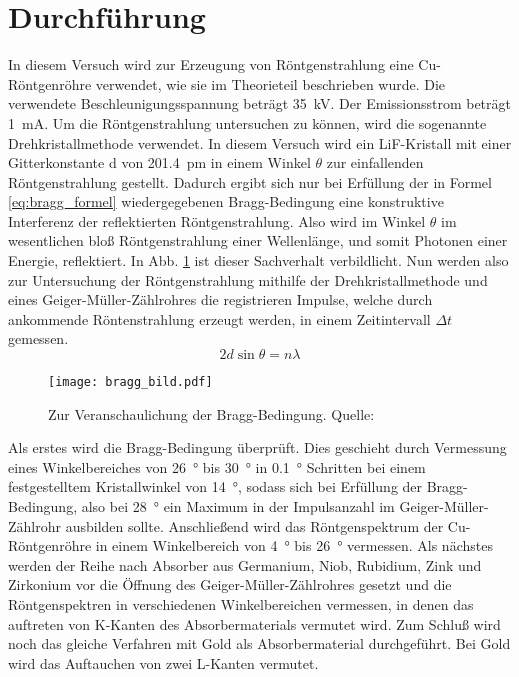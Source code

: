 
\section{Durchführung}
%
In diesem Versuch wird zur Erzeugung von Röntgenstrahlung eine
Cu-Röntgenröhre verwendet, wie sie im Theorieteil beschrieben wurde. Die
verwendete Beschleunigungsspannung beträgt \SI{35}{\kilo\volt}. Der
Emissionsstrom beträgt \SI{1}{\milli\ampere}.  Um die Röntgenstrahlung
untersuchen zu können, wird die sogenannte Drehkristallmethode
verwendet. In diesem Versuch wird ein LiF-Kristall mit einer
Gitterkonstante d von \SI{201.4}{\pico\metre} in einem Winkel $\theta$
zur einfallenden Röntgenstrahlung gestellt. Dadurch ergibt sich nur bei
Erfüllung der in Formel \eqref{eq:bragg_formel} wiedergegebenen
Bragg-Bedingung eine konstruktive Interferenz der reflektierten
Röntgenstrahlung. Also wird im Winkel $\theta$ im wesentlichen bloß
Röntgenstrahlung einer Wellenlänge, und somit Photonen einer Energie,
reflektiert. In Abb. \ref{fig:bragg_bild} ist dieser Sachverhalt
verbildlicht.  Nun werden also zur Untersuchung der Röntgenstrahlung
mithilfe der Drehkristallmethode und eines Geiger-Müller-Zählrohres die
registrieren Impulse, welche durch ankommende Röntenstrahlung erzeugt
werden, in einem Zeitintervall $\Delta t$ gemessen.
%
\begin{equation}
2 d \sin{\theta} = n \lambda
\label{eq:bragg_formel}
\end{equation}
%
%
\begin{figure}
\centering
\texttt{[image: bragg\_bild.pdf]}
\caption{Zur Veranschaulichung der Bragg-Bedingung. Quelle: \textcite{v602}}
\label{fig:bragg_bild}
\end{figure}
%
Als erstes wird die Bragg-Bedingung überprüft. Dies geschieht durch
Vermessung eines Winkelbereiches von \SI{26}{\degree} bis
\SI{30}{\degree} in \SI{0.1}{\degree} Schritten bei einem festgestelltem
Kristallwinkel von \SI{14}{\degree}, sodass sich bei Erfüllung der
Bragg-Bedingung, also bei \SI{28}{\degree} ein Maximum in der
Impulsanzahl im Geiger-Müller-Zählrohr ausbilden sollte.  Anschließend
wird das Röntgenspektrum der Cu-Röntgenröhre in einem Winkelbereich von
\SI{4}{\degree} bis \SI{26}{\degree} vermessen.  Als nächstes werden der
Reihe nach Absorber aus Germanium, Niob, Rubidium, Zink und Zirkonium
vor die Öffnung des Geiger-Müller-Zählrohres gesetzt und die
Röntgenspektren in verschiedenen Winkelbereichen vermessen, in denen das
auftreten von K-Kanten des Absorbermaterials vermutet wird.  Zum Schluß
wird noch das gleiche Verfahren mit Gold als Absorbermaterial
durchgeführt. Bei Gold wird das Auftauchen von zwei L-Kanten vermutet.
%